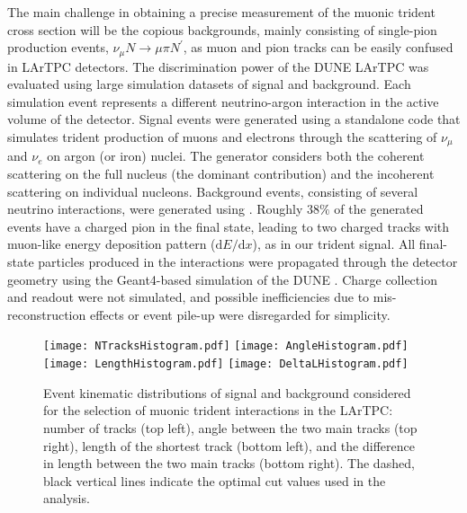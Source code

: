 The main challenge in obtaining a precise measurement of the muonic trident cross section will be the copious backgrounds, mainly consisting of  single-pion production events, $\nu_\mu N \to \mu \pi N^\prime$, as muon and pion tracks can be easily confused in LArTPC detectors. The discrimination power of the DUNE  LArTPC was evaluated using large simulation datasets of signal and background. Each simulation event represents a different neutrino-argon interaction in the active volume of the detector. Signal events were generated using a standalone code \cite{Altmannshofer:2019zhy} that simulates trident production of muons and electrons through the scattering of $\nu_{\mu}$ and $\nu_e$ on argon (or iron) nuclei. The generator considers both the coherent scattering on the full nucleus (the dominant contribution) and the incoherent scattering on individual nucleons. Background events, consisting of several  neutrino interactions, were generated using . Roughly $38\%$ of the generated events have a charged pion in the final state, leading to two charged tracks with muon-like energy deposition pattern ($\mathrm{d}E/\mathrm{d}x$), as in our trident signal. All final-state particles produced in the interactions were propagated through the detector geometry using the Geant4-based \cite{Agostinelli:2002hh,Allison:2006ve,Allison:2016lfl} simulation of the DUNE . Charge collection and readout were not simulated, and possible inefficiencies due to mis-reconstruction effects or event pile-up were disregarded for simplicity.

\begin{figure}[!tb]
\centering
\texttt{[image: NTracksHistogram.pdf]}
\texttt{[image: AngleHistogram.pdf]} \\[0.75\baselineskip]
\texttt{[image: LengthHistogram.pdf]}
\texttt{[image: DeltaLHistogram.pdf]}
\caption[Kinematic distributions of signal and background considered for the selection of muonic trident interactions in the  LArTPC]{Event kinematic distributions of signal and background considered for the selection of muonic trident interactions in the  LArTPC: number of tracks (top left), angle between the two main tracks (top right), length of the shortest track (bottom left), and the difference in length between the two main tracks (bottom right). The dashed, black vertical lines indicate the optimal cut values used in the analysis.} \label{fig:trident_kinematics}
\end{figure}

